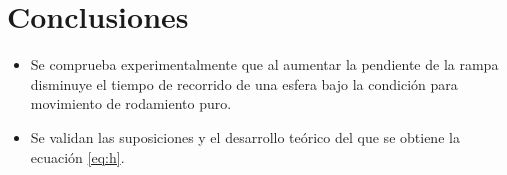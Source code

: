 \section{Conclusiones}
\begin{itemize}
    \item Se comprueba experimentalmente que al aumentar la pendiente de la rampa disminuye el tiempo de
    recorrido de una esfera bajo la condición para movimiento de rodamiento puro.
    \item Se validan las suposiciones y el desarrollo teórico del que se obtiene la ecuación \ref{eq:h}.
\end{itemize}